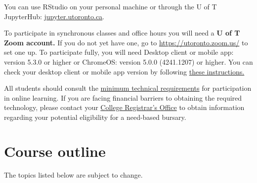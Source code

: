 \documentclass[
  openany]{book}
\begin{document}
You can use RStudio on your personal machine or through the U of T JupyterHub: \href{https://jupyter.utoronto.ca/}{jupyter.utoronto.ca}.

To participate in synchronous classes and office hours you will need a \textbf{U of T Zoom account.} If you do not yet have one, go to \url{https://utoronto.zoom.us/} to set one up. To participate fully, you will need Desktop client or mobile app: version 5.3.0 or higher or ChromeOS: version 5.0.0 (4241.1207) or higher. You can check your desktop client or mobile app version by following \href{https://support.zoom.us/hc/en-us/articles/201362393-Viewing-the-Zoom-version-number}{these instructions.}

All students should consult the \href{https://www.viceprovoststudents.utoronto.ca/covid-19/tech-requirements-online-learning/}{minimum technical requirements} for participation in online learning. If you are facing financial barriers to obtaining the required technology, please contact your \href{https://www.artsci.utoronto.ca/current/academic-advising-and-support/college-registrars-offices}{College Registrar's Office} to obtain information regarding your potential eligibility for a need-based bursary.

\hypertarget{course-outline}{%
\section{Course outline}\label{course-outline}}

The topics listed below are subject to change.
\end{document}
